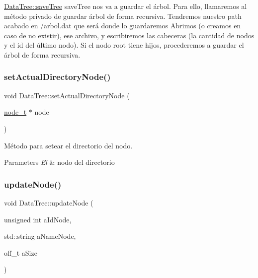 \hyperlink{classDataTree_ad82644547c535fa1802e166efb211a88}{Data\+Tree\+::save\+Tree} save\+Tree nos va a guardar el árbol. Para ello, llamaremos al método privado de guardar árbol de forma recursiva. Tendremos nuestro path acabado en /arbol.dat que será donde lo guardaremos Abrimos (o creamos en caso de no existir), ese archivo, y escribiremos las cabeceras (la cantidad de nodos y el id del último nodo). Si el nodo root tiene hijos, procederemos a guardar el árbol de forma recursiva. \mbox{\label{classDataTree_a24e9d2aac27bf64c33708e94ddf2c429}} 
\subsubsection{\texorpdfstring{set\+Actual\+Directory\+Node()}{setActualDirectoryNode()}}
{\footnotesize\ttfamily void Data\+Tree\+::set\+Actual\+Directory\+Node (\begin{DoxyParamCaption}\item[{\hyperlink{structnode__t}{node\+\_\+t} $\ast$}]{node }\end{DoxyParamCaption})\hspace{0.3cm}{\ttfamily [inline]}}



Método para setear el directorio del nodo. 


\begin{DoxyParams}{Parameters}
{\em El} & nodo del directorio \\
\hline
\end{DoxyParams}
\mbox{\label{classDataTree_a8b38e906b287a8968d910bd3c9d1c9ce}} 
\subsubsection{\texorpdfstring{update\+Node()}{updateNode()}}
{\footnotesize\ttfamily void Data\+Tree\+::update\+Node (\begin{DoxyParamCaption}\item[{unsigned int}]{a\+Id\+Node,  }\item[{std\+::string}]{a\+Name\+Node,  }\item[{off\+\_\+t}]{a\+Size }\end{DoxyParamCaption})}



